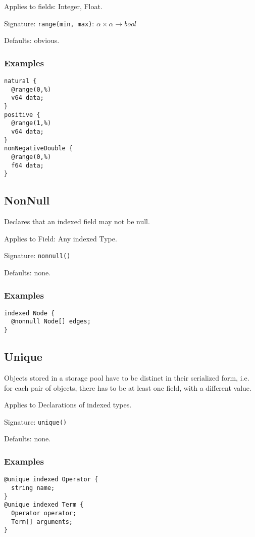 \documentclass[a4paper,10pt]{article}
\begin{document}
Applies to fields: Integer, Float.

Signature: \verb/range(min, max)/: $\alpha \times \alpha → bool$

Defaults: obvious.

\subsubsection*{Examples}
\begin{verbatim}
natural {
  @range(0,%)
  v64 data;
}
positive {
  @range(1,%)
  v64 data;
}
nonNegativeDouble {
  @range(0,%)
  f64 data;
}
\end{verbatim}

\subsection*{NonNull}
Declares that an indexed field may not be null.

Applies to Field: Any indexed Type.

Signature: \verb/nonnull()/

Defaults: none.

\subsubsection*{Examples}
\begin{verbatim}
indexed Node {
  @nonnull Node[] edges;
}
\end{verbatim}


\subsection*{Unique}
Objects stored in a storage pool have to be distinct in their serialized form, i.e. for each pair of objects, there has to be at least one field, with a different value.

Applies to Declarations of indexed types.

Signature: \verb/unique()/

Defaults: none.

\subsubsection*{Examples}

\begin{verbatim}
@unique indexed Operator {
  string name;
}
@unique indexed Term {
  Operator operator;
  Term[] arguments;
}
\end{verbatim}
\end{document}
